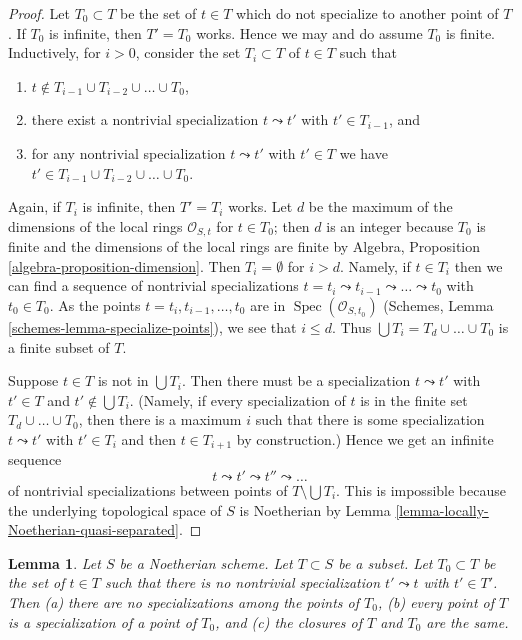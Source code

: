 \documentclass{stacks-project}
\theoremstyle{plain}
\newtheorem{lemma}[subsection]{Lemma}
\theoremstyle{definition}
\theoremstyle{remark}
\numberwithin{equation}{subsection}
\def\Spec{\mathop{\mathrm{Spec}}}
\begin{document}
\begin{proof}
Let $T_0 \subset T$ be the set of $t \in T$ which do not specialize
to another point of $T$. If $T_0$ is infinite, then $T' = T_0$ works.
Hence we may and do assume $T_0$ is finite.
Inductively, for $i > 0$, consider the set $T_i \subset T$
of $t \in T$ such that
\begin{enumerate}
\item $t \not \in T_{i - 1} \cup T_{i - 2} \cup \ldots \cup T_0$,
\item there exist a nontrivial specialization $t \leadsto t'$ with
$t' \in T_{i - 1}$, and
\item for any nontrivial specialization
$t \leadsto t'$ with $t' \in T$ we have
$t' \in T_{i - 1} \cup T_{i - 2} \cup \ldots \cup T_0$.
\end{enumerate}
Again, if $T_i$ is infinite, then $T' = T_i$ works.
Let $d$ be the maximum of the dimensions of the local rings
$\mathcal{O}_{S, t}$ for $t \in T_0$; then $d$ is an integer
because $T_0$ is finite and the dimensions of the local rings
are finite by Algebra, Proposition \ref{algebra-proposition-dimension}.
Then $T_i = \emptyset$ for $i > d$.
Namely, if $t \in T_i$ then we can find a sequence
of nontrivial specializations
$t = t_i \leadsto t_{i - 1} \leadsto \ldots \leadsto t_0$
with $t_0 \in T_0$. As
the points $t = t_i, t_{i - 1}, \ldots, t_0$ are in
$\Spec(\mathcal{O}_{S, t_0})$
(Schemes, Lemma \ref{schemes-lemma-specialize-points}),
we see that $i \leq d$.
Thus $\bigcup T_i = T_d \cup \ldots \cup T_0$ is a finite subset of $T$.

\medskip\noindent
Suppose $t \in T$ is not in $\bigcup T_i$. Then there must be a specialization
$t \leadsto t'$ with $t' \in T$ and $t' \not \in \bigcup T_i$. (Namely, if
every specialization of $t$ is in the finite set $T_d \cup \ldots \cup T_0$,
then there is a maximum $i$ such that there is some specialization
$t \leadsto t'$ with $t' \in T_i$ and then $t \in T_{i + 1}$ by construction.)
Hence we get an infinite sequence
$$
t \leadsto t' \leadsto t'' \leadsto \ldots
$$
of nontrivial specializations between points of $T \setminus \bigcup T_i$.
This is impossible because the underlying topological space of $S$
is Noetherian by Lemma \ref{lemma-locally-Noetherian-quasi-separated}.
\end{proof}

\begin{lemma}
\label{lemma-maximal-points}
Let $S$ be a Noetherian scheme. Let $T \subset S$ be a subset. Let
$T_0 \subset T$ be the set of $t \in T$ such that there is no nontrivial
specialization $t' \leadsto t$ with $t' \in T'$. Then (a) there are
no specializations among the points of $T_0$, (b) every point of
$T$ is a specialization of a point of $T_0$, and (c) the closures
of $T$ and $T_0$ are the same.
\end{lemma}
\end{document}
